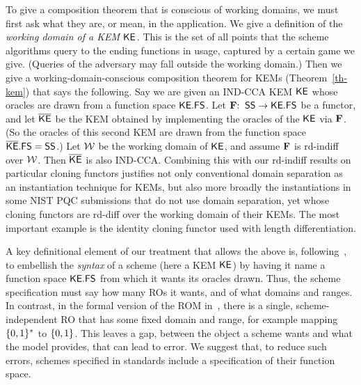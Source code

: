 To give a composition theorem that is conscious of working domains, we must first ask what they are, or mean, in the application. We give a definition of the \textit{working domain of a KEM ${\mathsf{KE}}$.} This is the set of all points that the scheme algorithms query to the ending functions in usage, captured by a certain game we give. (Queries of the adversary may fall outside the working domain.) Then we give a working-domain-conscious composition theorem for KEMs (Theorem~\ref{th-kem}) that says the following. Say we are given an IND-CCA KEM ${\mathsf{KE}}$ whose oracles are drawn from a function space $\mathsf{{\mathsf{KE}}.FS}$. Let $\mathbf{F}{:\;\;} \mathsf{SS} \to \mathsf{{\mathsf{KE}}.FS}$ be a functor, and let $\overline{\mathsf{KE}}$ be the KEM obtained by implementing the oracles of the ${\mathsf{KE}}$ via $\mathbf{F}$. (So the oracles of this second KEM are drawn from the function space $\mathsf{\overline{\mathsf{KE}}.FS} =  \mathsf{SS}$.) Let ${\cal W}$ be the working domain of ${\mathsf{KE}}$, and assume $\mathbf{F}$ is rd-indiff over ${\cal W}$. Then $\overline{\mathsf{KE}}$ is also IND-CCA. Combining this with our rd-indiff results on particular cloning functors justifies not only conventional domain separation as an instantiation technique for KEMs, but also more broadly the instantiations in some NIST PQC submissions that do not use domain separation, yet whose cloning functors are rd-diff over the working domain of their KEMs. The most important example is the identity cloning functor used with length differentiation.

A key definitional element of our treatment that allows the above is, following~\cite{EC:BelBerTes16}, to embellish the \textit{syntax} of a scheme (here a KEM ${\mathsf{KE}}$) by having it name a function space $\mathsf{{\mathsf{KE}}.FS}$ from which it wants its oracles drawn. Thus, the scheme specification must say how many ROs it wants, and of what domains and ranges. In contrast, in the formal version of the ROM in~\cite{CCS:BelRog93}, there is a single, scheme-independent RO that has some fixed domain and range, for example mapping $\{0,1\}^*$ to $\{0,1\}$. This leaves a gap, between the object a scheme wants and what the model provides, that can lead to error. We suggest that, to reduce such errors, schemes specified in standards include a specification of their function space.




